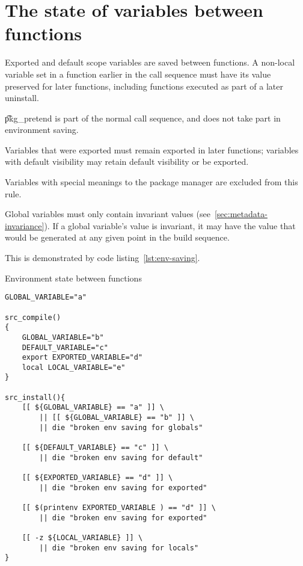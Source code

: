 \section{The state of variables between functions}
\label{sec:ebuild-env-state}

Exported and default scope variables are saved between functions. A non-local variable set in a
function earlier in the call sequence must have its value preserved for later functions, including
functions executed as part of a later uninstall.

\note \t{pkg\_pretend} is  part of the normal call sequence, and does not take part in
environment saving.

Variables that were exported must remain exported in later functions; variables with default
visibility may retain default visibility or be exported.

Variables with special meanings to the package manager are excluded from this rule.

Global variables must only contain invariant values (see~\ref{sec:metadata-invariance}). If a global
variable's value is invariant, it may have the value that would be generated at any given point
in the build sequence.

This is demonstrated by code listing~\ref{lst:env-saving}.

\begin{listing}
\caption{Environment state between functions} \label{lst:env-saving}
\begin{verbatim}
GLOBAL_VARIABLE="a"

src_compile()
{
    GLOBAL_VARIABLE="b"
    DEFAULT_VARIABLE="c"
    export EXPORTED_VARIABLE="d"
    local LOCAL_VARIABLE="e"
}

src_install(){
    [[ ${GLOBAL_VARIABLE} == "a" ]] \
        || [[ ${GLOBAL_VARIABLE} == "b" ]] \
        || die "broken env saving for globals"

    [[ ${DEFAULT_VARIABLE} == "c" ]] \
        || die "broken env saving for default"

    [[ ${EXPORTED_VARIABLE} == "d" ]] \
        || die "broken env saving for exported"

    [[ $(printenv EXPORTED_VARIABLE ) == "d" ]] \
        || die "broken env saving for exported"

    [[ -z ${LOCAL_VARIABLE} ]] \
        || die "broken env saving for locals"
}
\end{verbatim}
\end{listing}


